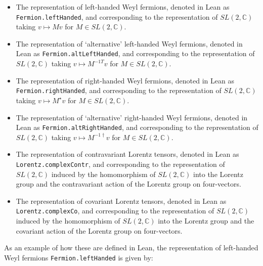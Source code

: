 \documentclass[a4paper, 11pt]{article}
\DeclareRobustCommand{\myinline}{\lstinline}
\begin{document}
\begin{itemize}
  \item The representation of left-handed Weyl fermions, 
    denoted in Lean as \myinline|Fermion.leftHanded|, and corresponding to the 
    representation of $SL(2, \mathbb{C})$ taking $v \mapsto M v$ for $M \in SL(2, \mathbb{C})$.
  \item \sloppy The representation of `alternative' left-handed Weyl fermions, 
    denoted in Lean as \myinline|Fermion.altLeftHanded|, and corresponding to the 
    representation of $SL(2, \mathbb{C})$ taking $v \mapsto M^{-1 T} v$ for $M \in SL(2, \mathbb{C})$.
  \item The representation of right-handed Weyl fermions, 
    denoted in Lean as \myinline|Fermion.rightHanded|, and corresponding to the 
    representation of $SL(2, \mathbb{C})$ taking $v \mapsto M^\star v$ for $M \in SL(2, \mathbb{C})$.
  \item The representation of `alternative' right-handed Weyl fermions,
    denoted in Lean as \myinline|Fermion.altRightHanded|, and corresponding to the 
    representation of $SL(2, \mathbb{C})$ taking $v \mapsto M^{-1 \dagger} v$ for $M \in SL(2, \mathbb{C})$.
  \item The representation of contravariant Lorentz tensors, 
    denoted in Lean as \myinline|Lorentz.complexContr|, and corresponding to the 
    representation of $SL(2, \mathbb{C})$ induced by the homomorphism of $SL(2, \mathbb{C})$ into 
    the Lorentz group and the contravariant action of the Lorentz group on four-vectors.
  \item The representation of covariant Lorentz tensors,
     denoted in Lean as \myinline|Lorentz.complexCo|, and corresponding to the 
    representation of $SL(2, \mathbb{C})$ induced by the homomorphism of $SL(2, \mathbb{C})$ into 
    the Lorentz group and the covariant action of the Lorentz group on four-vectors.
\end{itemize}
As an example of how these are defined in Lean, the representation of left-handed Weyl fermions  \myinline|Fermion.leftHanded|
is given by:
\end{document}
